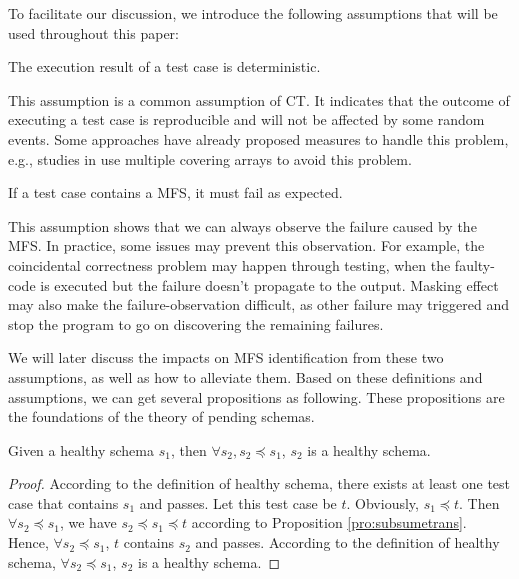 To facilitate our discussion, we introduce the following assumptions that will be used throughout this paper:

\begin{assumption}  The execution result of a test case is deterministic.
\end{assumption}

This assumption is a common assumption of CT\cite{zhang2011characterizing,ghandehari2012identifying,niu2013identifying}. It indicates that the outcome of executing a test case is reproducible and will not be affected by some random events. Some approaches have already proposed measures to handle this problem, e.g., studies in \cite{yilmaz2006covering,fouche2009incremental} use multiple covering arrays to avoid this problem.

\begin{assumption} If a test case contains a MFS, it must fail as expected.
\end{assumption}

This assumption shows that we can always observe the failure caused by the MFS. In practice, some issues may prevent this observation. For example, the coincidental correctness problem \cite{Masri:2014:PCC:2582050.2559932} may happen through testing, when the faulty-code is executed but the failure doesn't propagate to the output. Masking effect \cite{yilmaz2013reducing} may also make the failure-observation difficult, as other failure may triggered and stop the program to go on discovering the remaining failures.

We will later discuss the impacts on MFS identification from these two assumptions, as well as how to alleviate them. Based on these definitions and assumptions, we can get several propositions as following. These propositions are the foundations of the theory of pending schemas.





\begin{proposition}\label{pro:subofhealthy}
Given a healthy schema $s_{1}$, then $\forall s_{2}, s_{2} \preceq s_{1}$, $s_{2}$ is a healthy schema.
\end{proposition}

\begin{proof}
According to the definition of healthy schema,  there exists at least one test case that contains $s_{1}$ and passes. Let this test case be $t$. Obviously, $s_{1} \preceq t$.  Then $\forall s_{2} \preceq  s_{1}$, we have $s_{2} \preceq s_{1} \preceq t$ according to Proposition \ref{pro:subsumetrans}. Hence, $\forall s_{2} \preceq  s_{1}$,  $t$ contains $s_{2}$ and passes. According to the definition of healthy schema, $\forall s_{2} \preceq  s_{1}$, $s_{2}$ is a healthy schema.
\end{proof}

